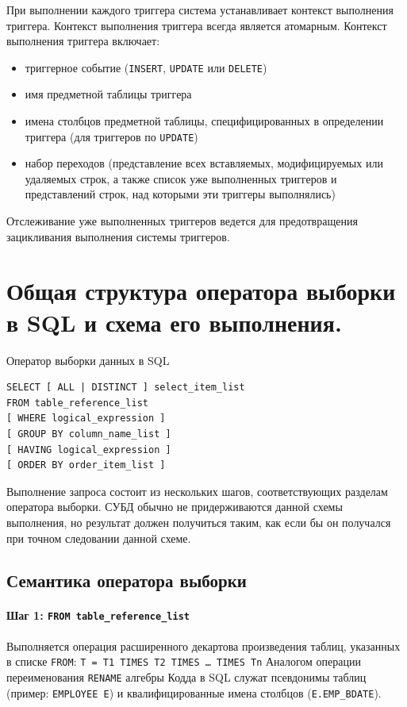\documentclass[a4paper,12pt]{article}
\begin{document}
При выполнении каждого триггера система устанавливает контекст выполнения триггера. Контекст выполнения триггера всегда является атомарным. Контекст выполнения триггера включает:
\begin{itemize}
    \item триггерное событие (\texttt{INSERT}, \texttt{UPDATE} или \texttt{DELETE})
    \item имя предметной таблицы триггера
    \item имена столбцов предметной таблицы, специфицированных в определении триггера (для триггеров по \texttt{UPDATE})
    \item набор переходов (представление всех вставляемых, модифицируемых или удаляемых строк, а также список уже выполненных триггеров и представлений строк, над которыми эти триггеры выполнялись)
\end{itemize}

Отслеживание уже выполненных триггеров ведется для предотвращения зацикливания выполнения системы триггеров.

\section{Общая структура оператора выборки в SQL и схема его выполнения.}

Оператор выборки данных в SQL  
\begin{lstlisting}
SELECT [ ALL | DISTINCT ] select_item_list
FROM table_reference_list
[ WHERE logical_expression ]
[ GROUP BY column_name_list ]
[ HAVING logical_expression ]
[ ORDER BY order_item_list ]
\end{lstlisting}

Выполнение запроса состоит из нескольких шагов, соответствующих разделам оператора выборки.  
СУБД обычно не придерживаются данной схемы выполнения, но результат должен получиться таким, как если бы он получался при точном следовании данной схеме.

\subsection{Семантика оператора выборки}

\paragraph{Шаг 1: \texttt{FROM table\_reference\_list}}  
Выполняется операция расширенного декартова произведения таблиц, указанных в списке \texttt{FROM}: \texttt{T = T1 TIMES T2 TIMES … TIMES Tn}  
Аналогом операции переименования \texttt{RENAME} алгебры Кодда в SQL служат псевдонимы таблиц (пример: \texttt{EMPLOYEE E}) и квалифицированные имена столбцов (\texttt{E.EMP\_BDATE}).
\end{document}
